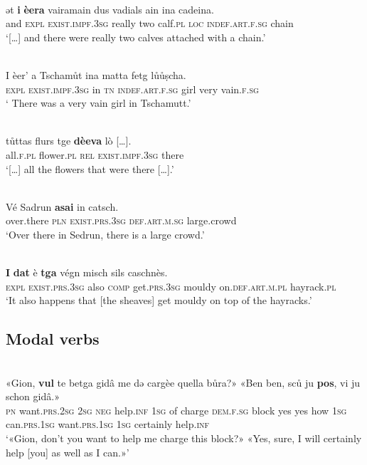 \ea\label{}
 {\citealt[69]{Büchli1966}}\\
\gll  ǝt \textbf{i} \textbf{èera} vairamain dus vadials ain ina cadeina.\\
     and \textsc{expl} \textsc{exist.impf.3sg} really two calf.\textsc{pl} \textsc{loc} \textsc{indef.art.f.sg}  chain\\
\glt `[…] and there were really two calves attached with a chain.'
\z

\ea\label{}
 {\citealt[82]{Büchli1966}}\\
\gll  I èer’ a Tschamůt ina matta fetg lůůṣcha.\\
     \textsc{expl} \textsc{exist.impf.3sg} in \textsc{tn} \textsc{indef.art.f.sg} girl very vain.\textsc{f.sg}\\
\glt ` There was a very vain girl in Tschamutt.'
\z

\ea\label{}
\\
\gll    […] tůttas flurs tge \textbf{dèeva} lò […].\\
     […] all.\textsc{f.pl} flower.\textsc{pl} \textsc{rel} \textsc{exist.impf.3sg} there \\
\glt `[…] all the flowers that were there […].'
\z

\ea\label{}
\\
\gll   Vé Sadrun \textbf{asai} in catsch.\\
   over.there \textsc{pln} \textsc{exist.prs.3sg} \textsc{def.art.m.sg} large.crowd \\
\glt `Over there in Sedrun, there is a large crowd.'
\z

\ea\label{}
\\
\gll   \textbf{I} \textbf{dat} è \textbf{tga} végn misch sils caschnès.\\
     \textsc{expl} \textsc{exist.prs.3sg} also \textsc{comp} get.\textsc{prs.3sg} mouldy on.\textsc{def.art.m.pl} hayrack.\textsc{pl}\\
\glt `It also happens that [the sheaves] get mouldy on top of the hayracks.'
\z


\subsection{Modal verbs}

\ea\label{}
 {\citealt[106]{Büchli1966}}\\
\gll    «Gion, \textbf{vul} te betga gidâ me dǝ cargèe quella bůra?» «Ben ben, sců ju \textbf{pos}, vi ju schon gidâ.»\\
     \textsc{pn} want.\textsc{prs.2sg} \textsc{2sg} \textsc{neg} help.\textsc{inf} \textsc{1sg} of charge \textsc{dem.f.sg} block yes yes how \textsc{1sg} can.\textsc{prs.1sg} want.\textsc{prs.1sg} \textsc{1sg} certainly help.\textsc{inf}\\
\glt `«Gion, don’t you want to help me charge this block?» «Yes, sure, I will certainly help [you] as well as I can.»'
\z

